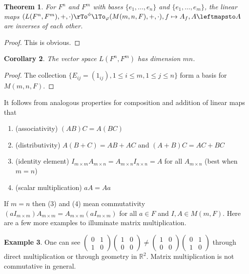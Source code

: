 \documentclass[12pt]{amsart}
\newtheorem{theorem}{Theorem}[section]
\newtheorem{corollary}[theorem]{Corollary}
\theoremstyle{definition}
\newtheorem{example}[theorem]{Example}
\begin{document}
\begin{theorem}\label{} For $F^n$ and $F^m$ with bases $\{e_1, \dots , e_n\}$ and $\{e_1, \dots , e_m\}$, the linear maps $(L(F^n, F^m), + , \cdot) \pile{\rTo^{\phi} \\ \lTo_{\varphi}} (M(m, n,F), + , \cdot), f \mapsto A_f, A \leftmapsto A$ are inverses of each other.
\end{theorem}
\begin{proof} This is obvious.
\end{proof}

\begin{corollary}\label{} The vector space $L(F^n,F^m)$ has dimension $mn$.
\end{corollary}
\begin{proof} The collection $\{E_{ij} = (1_{ij}), 1 \leq i \leq m, 1 \leq j \leq n\}$ form a basis for $M(m, n,F)$.
\end{proof}

It follows from analogous properties for composition and addition of linear maps that
\begin{enumerate}[\indent 1.]
\item (associativity) $(AB)C = A(BC)$
\item (distributivity) $A(B + C) = AB + AC$ and $(A + B)C = AC + BC$
\item (identity element) $I_{m \times m} A_{m \times n} = A_{m \times n}I_{n \times n} = A$ for all $A_{m \times n}$ (best when $m = n$)
\item (scalar multiplication) $a A = A a$
\end{enumerate}

If $m = n$ then (3) and (4) mean commutativity $(aI_{m \times m})A_{m \times m} = A_{m \times m}(aI_{m \times m})$ for all $a \in F$ and $I, A \in M(m, F)$. Here are a few more examples to illuminate matrix multiplication.

\begin{example} One can see $\left(\begin{array}{cc} 0 & 1 \\ 1 & 0 \end{array}\right) \left(\begin{array}{cc} 1 & 0 \\ 0 & 0 \end{array}\right) \neq \left(\begin{array}{cc} 1 & 0 \\ 0 & 0 \end{array}\right) \left(\begin{array}{cc} 0 & 1 \\ 1 & 0 \end{array}\right)$ through direct multiplication or through geometry in $\mathbb{R}^2$. Matrix multiplication is not commutative in general.
\end{example}
\end{document}
